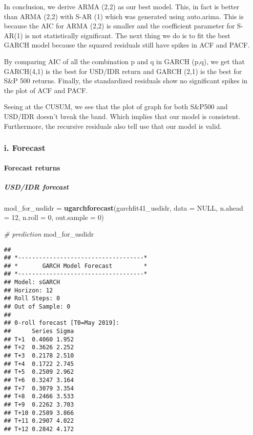 \documentclass[]{article}
\newenvironment{Shaded}{\begin{snugshade}}{\end{snugshade}}
\newcommand{\KeywordTok}[1]{\textcolor[rgb]{0.13,0.29,0.53}{\textbf{#1}}}
\newcommand{\DataTypeTok}[1]{\textcolor[rgb]{0.13,0.29,0.53}{#1}}
\newcommand{\DecValTok}[1]{\textcolor[rgb]{0.00,0.00,0.81}{#1}}
\newcommand{\StringTok}[1]{\textcolor[rgb]{0.31,0.60,0.02}{#1}}
\newcommand{\CommentTok}[1]{\textcolor[rgb]{0.56,0.35,0.01}{\textit{#1}}}
\newcommand{\OtherTok}[1]{\textcolor[rgb]{0.56,0.35,0.01}{#1}}
\newcommand{\NormalTok}[1]{#1}
\let\oldparagraph\paragraph
\renewcommand{\paragraph}[1]{\oldparagraph{#1}\mbox{}}
\let\oldsubparagraph\subparagraph
\renewcommand{\subparagraph}[1]{\oldsubparagraph{#1}\mbox{}}
\begin{document}
In conclusion, we derive ARMA (2,2) as our best model. This, in fact is
better than ARMA (2,2) with S-AR (1) which was generated using
auto.arima. This is because the AIC for ARMA (2,2) is smaller and the
coefficient parameter for S-AR(1) is not statistically significant. The
next thing we do is to fit the best GARCH model because the squared
residuals still have spikes in ACF and PACF.

By comparing AIC of all the combination p and q in GARCH (p,q), we get
that GARCH(4,1) is the best for USD/IDR return and GARCH (2,1) is the
best for S\&P 500 returns. Finally, the standardized residuals show no
significant spikes in the plot of ACF and PACF.

Seeing at the CUSUM, we see that the plot of graph for both S\&P500 and
USD/IDR doesn't break the band. Which implies that our model is
consistent. Furthermore, the recursive residuals also tell use that our
model is valid.

\subsubsection{i. Forecast}\label{i.-forecast}

\paragraph{Forecast returns}\label{forecast-returns}

\subparagraph{USD/IDR forecast}\label{usdidr-forecast}

\begin{Shaded}
\begin{Highlighting}[]
\NormalTok{mod_for_usdidr =}\StringTok{ }\KeywordTok{ugarchforecast}\NormalTok{(garchfit41_usdidr, }\DataTypeTok{data =} \OtherTok{NULL}\NormalTok{, }\DataTypeTok{n.ahead =} \DecValTok{12}\NormalTok{, }\DataTypeTok{n.roll =} \DecValTok{0}\NormalTok{, }\DataTypeTok{out.sample =} \DecValTok{0}\NormalTok{)}

\CommentTok{# prediction}
\NormalTok{mod_for_usdidr}
\end{Highlighting}
\end{Shaded}

\begin{verbatim}
## 
## *------------------------------------*
## *       GARCH Model Forecast         *
## *------------------------------------*
## Model: sGARCH
## Horizon: 12
## Roll Steps: 0
## Out of Sample: 0
## 
## 0-roll forecast [T0=May 2019]:
##      Series Sigma
## T+1  0.4060 1.952
## T+2  0.3626 2.252
## T+3  0.2178 2.510
## T+4  0.1722 2.745
## T+5  0.2509 2.962
## T+6  0.3247 3.164
## T+7  0.3079 3.354
## T+8  0.2466 3.533
## T+9  0.2262 3.703
## T+10 0.2589 3.866
## T+11 0.2907 4.022
## T+12 0.2842 4.172
\end{verbatim}
\end{document}
